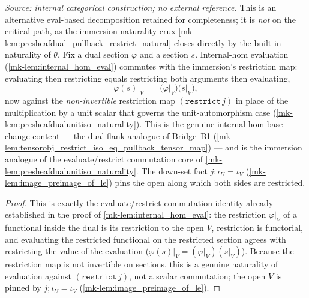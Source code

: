 \begin{lemma}\label{mk-lem:presheafdual_eval_restrict_commute_apply}
  \leanok

  \textit{Source: internal categorical construction; no external reference.}
  This is an alternative eval-based decomposition retained for completeness; it is \emph{not} on the
  critical path, as the immersion-naturality crux \ref{mk-lem:presheafdual_pullback_restrict_natural}
  closes directly by the built-in naturality of \(\theta\).
  Fix a dual section \(\varphi\) and a section \(s\). Internal-hom evaluation
  (\ref{mk-lem:internal_hom_eval}) commutes with the immersion's restriction map: evaluating then
  restricting equals restricting both arguments then evaluating,
  \[
    \varphi(s)\big|_V \;=\; \bigl(\varphi\big|_V\bigr)\bigl(s\big|_V\bigr),
  \]
  now against the \emph{non-invertible} restriction map \((\mathtt{restrict}\,j)\) in place of the
  multiplication by a unit scalar that governs the unit-automorphism case
  (\ref{mk-lem:presheafdualunitiso_naturality}). This is the genuine internal-hom base-change content ---
  the dual-flank analogue of Bridge~B1 (\ref{mk-lem:tensorobj_restrict_iso_eq_pullback_tensor_map}) ---
  and is the immersion analogue of the evaluate/restrict commutation core of
  \ref{mk-lem:presheafdualunitiso_naturality}. The
  down-set fact \(j \mathbin{;} \iota_U = \iota_V\) (\ref{mk-lem:image_preimage_of_le}) pins the open
  along which both sides are restricted.
\end{lemma}
\begin{proof}
  \leanok
  This is exactly the evaluate/restrict-commutation identity already established in the proof of
  \ref{mk-lem:internal_hom_eval}: the restriction \(\varphi|_V\) of a functional inside the dual is its
  restriction to the open \(V\), restriction is functorial, and evaluating the restricted functional
  on the restricted section agrees with restricting the value of the evaluation
  (\(\varphi(s)|_V = (\varphi|_V)(s|_V)\)). Because the restriction map is not invertible on sections,
  this is a genuine naturality of evaluation against \((\mathtt{restrict}\,j)\), not a scalar
  commutation; the open \(V\) is pinned by \(j \mathbin{;} \iota_U = \iota_V\)
  (\ref{mk-lem:image_preimage_of_le}).
\end{proof}

